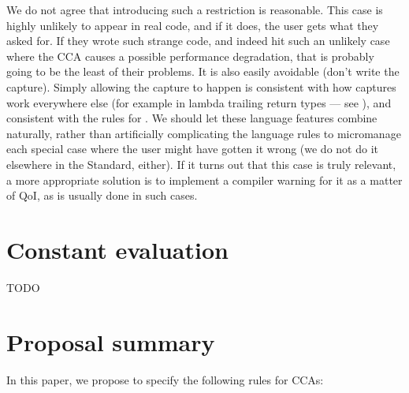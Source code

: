 We do not agree that introducing such a restriction is reasonable. This case is highly unlikely to appear in real code, and if it does, the user gets what they asked for. If they wrote such strange code, and indeed hit such an unlikely case where the CCA causes a possible performance degradation, that is probably going to be the least of their problems. It is also easily avoidable (don't write the capture). Simply allowing the capture to happen is consistent with how captures work everywhere else (for example in lambda trailing return types --- see \cite{P2036R3}), and consistent with the rules for . We should let these language features combine naturally, rather than artificially complicating the language rules to micromanage each special case where the user might have gotten it wrong (we do not do it elsewhere in the Standard, either). If it turns out that this case is truly relevant, a more appropriate solution is to implement a compiler warning for it as a matter of QoI, as is usually done in such cases.

\section{Constant evaluation}

TODO

\section{Proposal summary}

In this paper, we propose to specify the following rules for CCAs:

